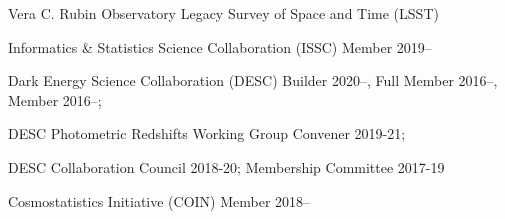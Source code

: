 \documentclass[11pt,letterpaper]{article}
\begin{document}
%

\begin{list}{}{\malzlist}
	\item Vera C. Rubin Observatory Legacy Survey of Space and Time (LSST)
	\begin{list}{}{\malzlist}
		\item Informatics \& Statistics Science Collaboration (ISSC) Member 2019--
		\item Dark Energy Science Collaboration (DESC) Builder 2020--, Full Member 2016--, Member 2016--;
		\item DESC Photometric Redshifts Working Group Convener 2019-21;
		\item DESC Collaboration Council 2018-20; Membership Committee 2017-19
	\end{list}
	\item Cosmostatistics Initiative (COIN) Member 2018--
\end{list}
\end{document}

